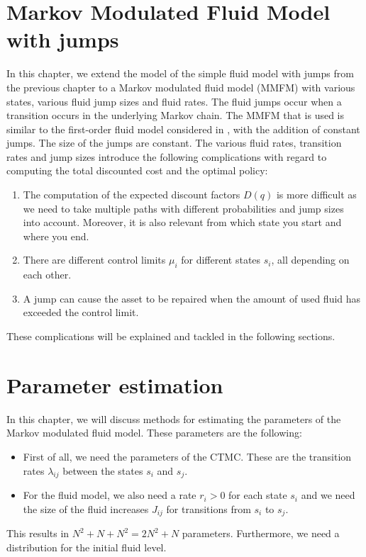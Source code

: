 \chapter{Markov Modulated Fluid Model with jumps}\label{chapter:Mmfm}
In this chapter, we extend the model of the simple fluid model with jumps from the previous chapter to a Markov modulated fluid model (MMFM) with various states, various fluid jump sizes and fluid rates.
The fluid jumps occur when a transition occurs in the underlying Markov chain.
The MMFM that is used is similar to the first-order fluid model considered in \cite{Gribaudo2007}, with the addition of constant jumps.
The size of the jumps are constant.
The various fluid rates, transition rates and jump sizes introduce the following complications with regard to computing the total discounted cost and the optimal policy:
\begin{enumerate}
	\item The computation of the expected discount factors $D(q)$ is more difficult as we need to take multiple
	paths with different probabilities and jump sizes into account.
	Moreover, it is also relevant from which state you start and where you end.
	\item There are different control limits $\mu_i$ for different states $s_i$, all depending on each other.
	\item A jump can cause the asset to be repaired when the amount of used fluid has exceeded the control limit.
\end{enumerate}
These complications will be explained and tackled in the following sections.











\chapter{Parameter estimation}\label{chapter:ParameterEstimation}
In this chapter, we will discuss methods for estimating the parameters of the Markov modulated fluid model.
These parameters are the following:
\begin{itemize}
	\item First of all, we need the parameters of the CTMC.
	These are the transition rates $\lambda_{ij}$ between the states $s_i$ and $s_j$.
	\item For the fluid model, we also need a rate $r_i>0$ for each state $s_i$ and we need the size of the fluid increases $J_{ij}$ for transitions from $s_i$ to $s_j$. 
\end{itemize}
This results in $N^2+N+N^2=2N^2+N$ parameters.
Furthermore, we need a distribution for the initial fluid level.
